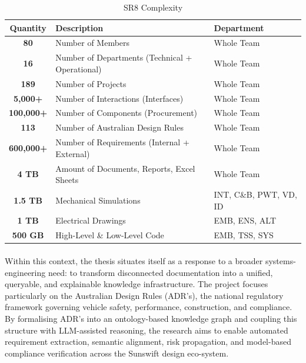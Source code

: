         \vspace{1cm}
        \begin{table}[h]
            \centering
            \renewcommand{\arraystretch}{1.2}
            \begin{tabularx}{\textwidth}{|c|X|X|}
            \hline
            \textbf{Quantity} & \textbf{Description} & \textbf{Department} \\
            \hline
            \textbf{80} & Number of Members & Whole Team \\ \hline
            \textbf{16} & Number of Departments \newline (Technical + Operational) & Whole Team \\ \hline
            \textbf{189} & Number of Projects & Whole Team \\ \hline
            \textbf{5,000+} & Number of Interactions \newline (Interfaces) & Whole Team \\ \hline
            \textbf{100,000+} & Number of Components \newline (Procurement) & Whole Team \\ \hline
            \textbf{113} & Number of Australian Design Rules & Whole Team \\ \hline
            \textbf{600,000+} & Number of Requirements \newline (Internal + External) & Whole Team \\ \hline
            \textbf{4 TB} & Amount of Documents, Reports, \newline Excel Sheets & Whole Team \\ \hline
            \textbf{1.5 TB} & Mechanical Simulations & INT, C\&B, PWT, VD, ID \\ \hline
            \textbf{1 TB} & Electrical Drawings & EMB, ENS, ALT \\ \hline
            \textbf{500 GB} & High-Level \& Low-Level Code & EMB, TSS, SYS \\
            \hline
            \end{tabularx}
            \caption{SR8 Complexity}
        \end{table}

        \paragraph{} Within this context, the thesis situates itself as a response to a broader systems-engineering need: to transform disconnected documentation into a unified, queryable, and explainable knowledge infrastructure. The project focuses particularly on the Australian Design Rules (ADR's), the national regulatory framework governing vehicle safety, performance, construction, and compliance. By formalising ADR's into an ontology-based knowledge graph and coupling this structure with LLM-assisted reasoning, the research aims to enable automated requirement extraction, semantic alignment, risk propagation, and model-based compliance verification across the Sunswift design eco-system.

